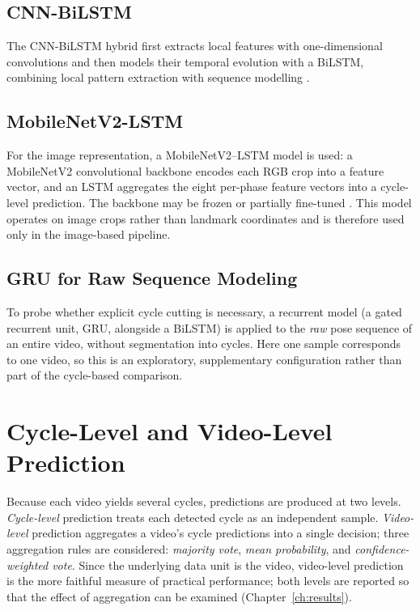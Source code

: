 \subsection{CNN-BiLSTM}
\label{sec:method-cnn-bilstm}

The CNN-BiLSTM hybrid first extracts local features with one-dimensional
convolutions and then models their temporal evolution with a BiLSTM, combining
local pattern extraction with sequence modelling \cite{donahue2015lrcn}.

\subsection{MobileNetV2-LSTM}
\label{sec:method-mobilenet}

For the image representation, a MobileNetV2--LSTM model is used: a MobileNetV2
convolutional backbone encodes each RGB crop into a feature vector, and an LSTM
aggregates the eight per-phase feature vectors into a cycle-level prediction. The
backbone may be frozen or partially fine-tuned
\cite{sandler2018mobilenetv2, donahue2015lrcn}. This model operates on image
crops rather than landmark coordinates and is therefore used only in the
image-based pipeline.

\subsection{GRU for Raw Sequence Modeling}
\label{sec:method-gru}

To probe whether explicit cycle cutting is necessary, a recurrent model
(a gated recurrent unit, GRU, alongside a BiLSTM) is applied to the
\emph{raw} pose sequence of an entire video, without segmentation into cycles.
Here one sample corresponds to one video, so this is an exploratory,
supplementary configuration rather than part of the cycle-based comparison.

\section{Cycle-Level and Video-Level Prediction}
\label{sec:method-cycle-video}

Because each video yields several cycles, predictions are produced at two
levels. \emph{Cycle-level} prediction treats each detected cycle as an
independent sample. \emph{Video-level} prediction aggregates a video's cycle
predictions into a single decision; three aggregation rules are considered:
\emph{majority vote}, \emph{mean probability}, and \emph{confidence-weighted
vote}. Since the underlying data unit is the video, video-level prediction is
the more faithful measure of practical performance; both levels are reported so
that the effect of aggregation can be examined (Chapter~\ref{ch:results}).

